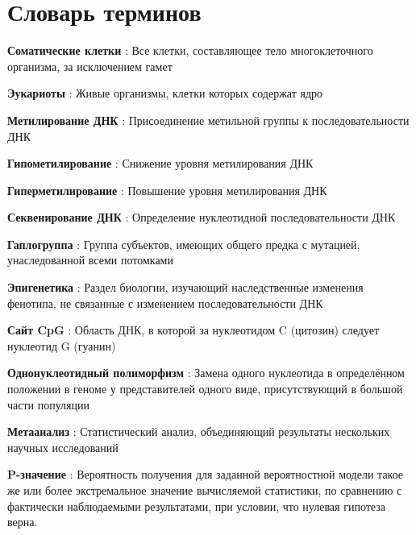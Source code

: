\chapter*{Словарь терминов}             %

\textbf{Соматические клетки} : Все клетки, составляющее тело многоклеточного организма, за исключением гамет

\textbf{Эукариоты} : Живые организмы, клетки которых содержат ядро

\textbf{Метилирование ДНК} : Присоединение метильной группы к последовательности ДНК

\textbf{Гипометилирование} : Снижение уровня метилирования ДНК

\textbf{Гиперметилирование} : Повышение уровня метилирования ДНК

\textbf{Секвенирование ДНК} : Определение нуклеотидной последовательности ДНК

\textbf{Гаплогруппа} : Группа субъектов, имеющих общего предка с мутацией, унаследованной всеми потомками

\textbf{Эпигенетика} : Раздел биологии, изучающий наследственные изменения фенотипа, не связанные с изменением последовательности ДНК

\textbf{Сайт CpG} : Область ДНК, в которой за нуклеотидом C (цитозин) следует нуклеотид G (гуанин)

\textbf{Однонуклеотидный полиморфизм} : Замена одного нуклеотида в определённом положении в геноме у представителей одного виде, присутствующий в большой части популяции 

\textbf{Метаанализ} : Статистический анализ, объединяющий результаты нескольких научных исследований

\textbf{P-значение} : Вероятность получения для заданной вероятностной модели такое же или более экстремальное значение вычисляемой статистики, по сравнению с фактически наблюдаемыми результатами, при условии, что нулевая гипотеза верна.

